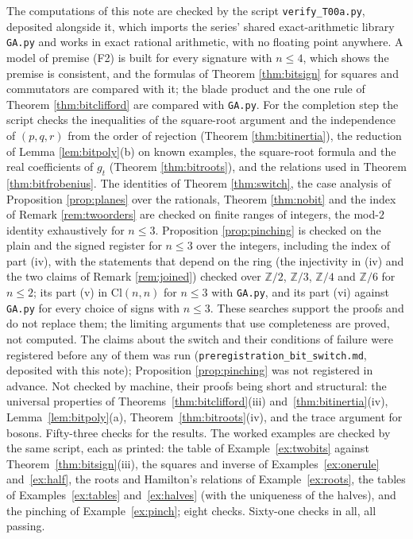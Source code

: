 \documentclass[11pt]{article}
\theoremstyle{plain}
\theoremstyle{definition}
\theoremstyle{plain}
\theoremstyle{definition}
\newcommand{\Cl}{\mathrm{Cl}}
\newcommand{\Z}{\mathbb{Z}}
\begin{document}
The computations of this note are checked by the script \texttt{verify\_T00a.py}, deposited alongside it, which imports the series' shared exact-arithmetic library \texttt{GA.py} and works in exact rational arithmetic, with no floating point anywhere. A model of premise (F2) is built for every signature with $n \leq 4$, which shows the premise is consistent, and the formulas of Theorem \ref{thm:bitsign} for squares and commutators are compared with it; the blade product and the one rule of Theorem \ref{thm:bitclifford} are compared with \texttt{GA.py}. For the completion step the script checks the inequalities of the square-root argument and the independence of $(p,q,r)$ from the order of rejection (Theorem \ref{thm:bitinertia}), the reduction of Lemma \ref{lem:bitpoly}(b) on known examples, the square-root formula and the real coefficients of $g_{t}$ (Theorem \ref{thm:bitroots}), and the relations used in Theorem \ref{thm:bitfrobenius}. The identities of Theorem \ref{thm:switch}, the case analysis of Proposition \ref{prop:planes} over the rationals, Theorem \ref{thm:nobit} and the index of Remark \ref{rem:twoorders} are checked on finite ranges of integers, the mod-$2$ identity exhaustively for $n \leq 3$. Proposition \ref{prop:pinching} is checked on the plain and the signed register for $n \leq 3$ over the integers, including the index of part (iv), with the statements that depend on the ring (the injectivity in (iv) and the two claims of Remark \ref{rem:joined}) checked over $\Z/2$, $\Z/3$, $\Z/4$ and $\Z/6$ for $n \leq 2$; its part (v) in $\Cl(n,n)$ for $n \leq 3$ with \texttt{GA.py}, and its part (vi) against \texttt{GA.py} for every choice of signs with $n \leq 3$. These searches support the proofs and do not replace them; the limiting arguments that use completeness are proved, not computed. The claims about the switch and their conditions of failure were registered before any of them was run (\texttt{preregistration\_bit\_switch.md}, deposited with this note); Proposition \ref{prop:pinching} was not registered in advance. Not checked by machine, their proofs being short and structural: the universal properties of Theorems~\ref{thm:bitclifford}(iii) and~\ref{thm:bitinertia}(iv), Lemma~\ref{lem:bitpoly}(a), Theorem~\ref{thm:bitroots}(iv), and the trace argument for bosons. Fifty-three checks for the results. The worked examples are checked by the same script, each as printed: the table of Example~\ref{ex:twobits} against Theorem~\ref{thm:bitsign}(iii), the squares and inverse of Examples~\ref{ex:onerule} and~\ref{ex:half}, the roots and Hamilton's relations of Example~\ref{ex:roots}, the tables of Examples~\ref{ex:tables} and~\ref{ex:halves} (with the uniqueness of the halves), and the pinching of Example~\ref{ex:pinch}; eight checks. Sixty-one checks in all, all passing.
\end{document}
